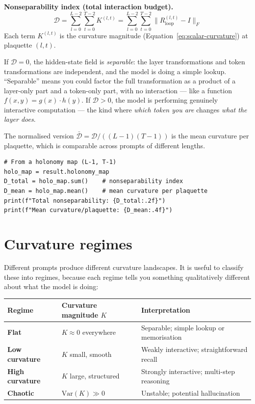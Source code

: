 \documentclass[11pt, twoside, openright]{memoir}
\numberwithin{equation}{chapter}
\begin{document}
\begin{gabox}
\textbf{Nonseparability index (total interaction budget).}
\begin{equation}
\label{eq:nonsep-index}
  \mathcal{D} = \sum_{l=0}^{L-2}\sum_{t=0}^{T-2}
    K^{(l,t)}
  = \sum_{l=0}^{L-2}\sum_{t=0}^{T-2}
    \|R_{\mathrm{loop}}^{(l,t)} - I\|_F
\end{equation}
Each term $K^{(l,t)}$ is the curvature magnitude
(Equation~\eqref{eq:scalar-curvature}) at plaquette $(l, t)$.
\end{gabox}

If $\mathcal{D} = 0$, the hidden-state field is \emph{separable}: the
layer transformations and token transformations are independent, and the
model is doing a simple lookup.  ``Separable'' means you could factor
the full transformation as a product of a layer-only part and a
token-only part, with no interaction --- like a function
$f(x,y) = g(x) \cdot h(y)$.  If $\mathcal{D} > 0$, the model is
performing genuinely interactive computation --- the kind where
\emph{which token you are} changes \emph{what the layer does}.

The normalised version $\bar{\mathcal{D}} = \mathcal{D} /
((L-1)(T-1))$ is the mean curvature per plaquette, which is comparable
across prompts of different lengths.

\begin{lstlisting}[caption={Computing the nonseparability index}]
# From a holonomy map (L-1, T-1)
holo_map = result.holonomy_map
D_total = holo_map.sum()    # nonseparability index
D_mean = holo_map.mean()    # mean curvature per plaquette
print(f"Total nonseparability: {D_total:.2f}")
print(f"Mean curvature/plaquette: {D_mean:.4f}")
\end{lstlisting}

\section{Curvature regimes}

Different prompts produce different curvature landscapes.  It is useful
to classify these into regimes, because each regime tells you something
qualitatively different about what the model is doing:

\begin{center}
\renewcommand{\arraystretch}{1.3}\small
\begin{tabular}{@{} l l l @{}}
\toprule
\textbf{Regime} & \textbf{Curvature magnitude $K$} & \textbf{Interpretation} \\
\midrule
\textbf{Flat} & $K \approx 0$ everywhere
  & Separable; simple lookup or memorisation \\
\textbf{Low curvature} & $K$ small, smooth
  & Weakly interactive; straightforward recall \\
\textbf{High curvature} & $K$ large, structured
  & Strongly interactive; multi-step reasoning \\
\textbf{Chaotic} & $\mathrm{Var}(K) \gg 0$
  & Unstable; potential hallucination \\
\bottomrule
\end{tabular}
\end{center}
\end{document}
